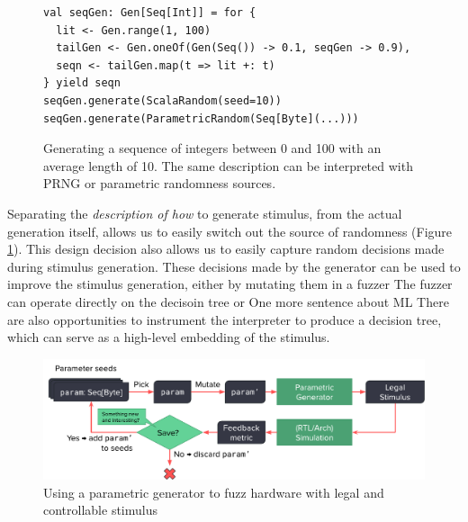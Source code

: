 \documentclass[sigplan,review,nonacm,9pt]{acmart}
\begin{document}
\begin{figure}
\begin{verbatim}
val seqGen: Gen[Seq[Int]] = for {
  lit <- Gen.range(1, 100)
  tailGen <- Gen.oneOf(Gen(Seq()) -> 0.1, seqGen -> 0.9),
  seqn <- tailGen.map(t => lit +: t)
} yield seqn
seqGen.generate(ScalaRandom(seed=10))
seqGen.generate(ParametricRandom(Seq[Byte](...)))
\end{verbatim}
\caption{Generating a sequence of integers between 0 and 100 with an average length of 10. The same description can be interpreted with PRNG or parametric randomness sources.}
\label{fig:randomapi}
\end{figure}

Separating the \textit{description of how} to generate stimulus, from the actual generation itself, allows us to easily switch out the source of randomness (Figure \ref{fig:randomapi}).
This design decision also allows us to easily capture random decisions made during stimulus generation.
These decisions made by the generator can be used to improve the stimulus generation, either by mutating them in a fuzzer 
The fuzzer can operate directly on the decisoin tree or 
One more sentence about ML
There are also opportunities to instrument the interpreter to produce a decision tree, which can serve as a high-level embedding of the stimulus.

\begin{figure}
\includegraphics[width=\linewidth]{fuzzing/parametric_fuzzing_hw.pdf}
\caption{Using a parametric generator to fuzz hardware with legal and controllable stimulus}
\label{fig:parametric_fuzzing}
\end{figure}
\end{document}
